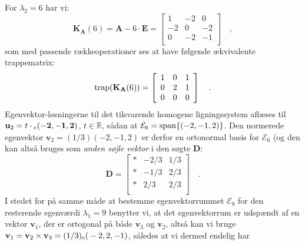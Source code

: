 \begin{example}
For $\lambda_{2}  = 6$ har vi:
\begin{equation}
\mathbf{K}_{\mathbf{A}}(6) = \mathbf{A} - 6\cdot\mathbf{E} = \left[
                                          \begin{array}{rrr}
                                           1  & -2  & 0 \\
                                            -2 &  0 &  -2\\
                                            0 &  -2 & -1 \\
                                          \end{array}
                                        \right] \quad ,
\end{equation}
som med passende rækkeoperationer ses at have følgende ækvivalente trappematrix:
\begin{equation}
\mathrm{trap}(\mathbf{K}_{\mathbf{A}}(6)) = \left[
                                          \begin{array}{rrr}
                                            1 &  0 & 1 \\
                                            0 & 2 & 1 \\
                                            0 & 0& 0 \\
                                          \end{array}
                                        \right] \quad .
\end{equation}
Egenvektor-løsningerne til det tilsvarende homogene ligningssystem aflæses til $\mathbf{u}_{2} = t\cdot{_\mathrm{e}\mathbf{(-2, -1, 2)}}$, $t \in \mathbb{R}$, sådan at $\mathcal{E}_{6}= \mathrm{span}\{(-2, -1, 2)\}$. Den normerede egenvektor $\mathbf{v}_{2} = (1/3)(-2, -1, 2)$ er derfor en ortonormal basis for $\mathcal{E}_{6}$ (og den kan altså bruges som {\textit{anden søjle vektor}} i den søgte $\mathbf{D}$:
\begin{equation}
\mathbf{D}= \left[
          \begin{array}{rrr}
            * & -2/3 & 1/3 \\
            * & -1/3 & 2/3 \\
            * & 2/3 & 2/3 \\
          \end{array}
        \right] \quad .
\end{equation}
I stedet for på samme måde at bestemme egenvektorrummet $\mathcal{E}_{9}$ for den resterende egenværdi $\lambda_{1} = 9$ benytter vi, at det egenvektorrum er udspændt af en vektor $\mathbf{v}_{1}$, der er ortogonal på både $\mathbf{v}_{3}$ og $\mathbf{v}_{2}$, altså kan vi bruge $\mathbf{v}_{1} = \mathbf{v}_{2} \times \mathbf{v}_{3} = (1/3){_\mathrm{e}\mathbf{(}}-2, 2, -1)$, således at vi dermed endelig har

\end{example}
